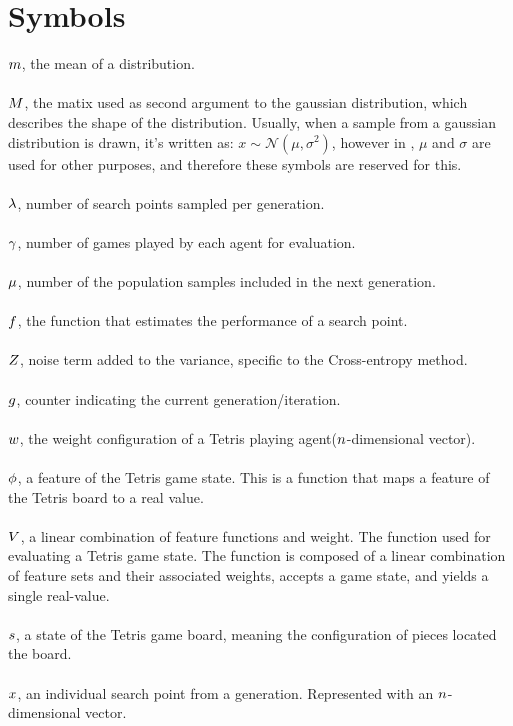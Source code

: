 \clearpage
\section*{Symbols}

$m$, the mean of a distribution.\\
\\
$M$, the matix used as 
second argument to the gaussian distribution, 
which describes the shape of the distribution. 
Usually, when a sample from a gaussian distribution 
is drawn, it's written as: 
$x \sim \mathcal{N} \left( \mu, \sigma^{2} \right)$, 
however in \citep{hansen2011},
$\mu$ and $\sigma$ are used for other 
purposes, and therefore these symbols are reserved for this.\\
\\
$\lambda$, number of search points sampled per generation.\\
\\
$\gamma$, number of games played by each agent for evaluation.\\
\\
$\mu$, number of the population samples included in the next generation.\\
\\
$f$, the function that estimates the performance of a search point.\\
\\
$Z$, noise term added to the variance, specific to the Cross-entropy method.\\
\\
$g$, counter indicating the current generation/iteration.\\
\\
$w$, the weight configuration of a Tetris playing agent($n $-dimensional vector).\\
\\
$\phi$, a feature of the Tetris game state. This is a function that maps a 
feature of the Tetris board to a real value.\\
\\
$V$, a linear combination of feature functions and weight. 
The function used for evaluating a Tetris game state. 
The function is composed of a linear combination of feature sets and their
associated weights, accepts a game state, and yields a single real-value.\\
\\
$s$, a state of the Tetris game board, meaning the
configuration of pieces located the board.\\
\\
$x$, an individual search point from a generation. 
Represented with an $n$-dimensional vector.

\clearpage

